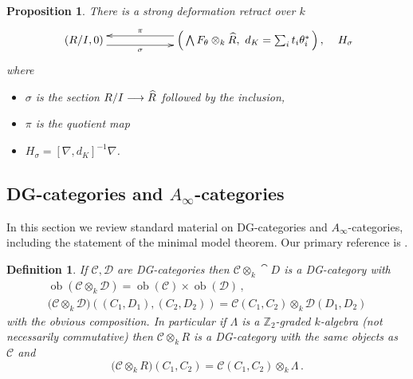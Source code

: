 \documentclass[english,letter paper,12pt,leqno]{article}
\newtheorem{proposition}[theorem]{Proposition}
\theoremstyle{example}
\newtheorem{definition}[theorem]{Definition}
\numberwithin{equation}{section}
\begin{document}
\begin{proposition} There is a strong deformation retract over $k$
\begin{equation}\label{eq:defn_sdr}
\xymatrix@C+3pc{
(R/I,0) \ar@<-1ex>[r]_-\sigma & \Big( \bigwedge F_\theta \otimes_k \widehat{R}, \,\,d_K = \sum_i t_i \theta_i^*\, \Big)\,, \ar@<-1ex>[l]_-\pi
}\quad H_\sigma
\end{equation}
where
\begin{itemize}
\item $\sigma$ is the section $R/I \longrightarrow \widehat{R}$ followed by the inclusion,
\item $\pi$ is the quotient map 
\item $H_\sigma = [\nabla, d_K]^{-1} \nabla$.
\end{itemize}
\end{proposition}

\subsection{DG-categories and $A_\infty$-categories}

In this section we review standard material on DG-categories and $A_\infty$-categories, including the statement of the minimal model theorem. Our primary reference is \cite{lazaroiu}.

\begin{definition} If $\mathscr{C}, \mathscr{D}$ are DG-categories then $\mathscr{C} \otimes_k \cat{D}$ is a DG-category with
\begin{gather*}
\operatorname{ob}( \mathscr{C} \otimes_k \mathscr{D} ) = \operatorname{ob}(\mathscr{C}) \times \operatorname{ob}(\mathscr{D})\,,\\
\big( \mathscr{C} \otimes_k \mathscr{D} \big)( (C_1, D_1), (C_2, D_2) ) = \mathscr{C}(C_1, C_2) \otimes_k \mathscr{D}(D_1, D_2)
\end{gather*}
with the obvious composition. In particular if $\Lambda$ is a $\mathbb{Z}_2$-graded $k$-algebra (not necessarily commutative) then $\mathscr{C} \otimes_k R$ is a DG-category with the same objects as $\mathscr{C}$ and
\[
\big( \mathscr{C} \otimes_k R \big)( C_1, C_2 ) = \mathscr{C}(C_1, C_2) \otimes_k \Lambda\,.
\]
\end{definition}
\end{document}
